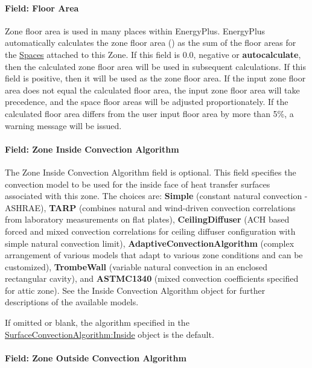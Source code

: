 \paragraph{Field: Floor Area}\label{field-floor-area}

Zone floor area is used in many places within EnergyPlus. EnergyPlus automatically calculates the zone floor area (\SI{}{\area}) as the sum of the floor areas for the \hyperref[space]{Spaces} attached to this Zone. If this field is 0.0, negative or \textbf{autocalculate}, then the calculated zone floor area will be used in subsequent calculations. If this field is positive, then it will be used as the zone floor area. If the input zone floor area does not equal the calculated floor area, the input zone floor area will take precedence, and the space floor areas will be adjusted proportionately. If the calculated floor area differs from the user input floor area by more than 5\%, a warning message will be issued.

\paragraph{Field: Zone Inside Convection Algorithm}\label{field-zone-inside-convection-algorithm}

The Zone Inside Convection Algorithm field is optional. This field specifies the convection model to be used for the inside face of heat transfer surfaces associated with this zone. The choices are: \textbf{Simple} (constant natural convection - ASHRAE), \textbf{TARP} (combines natural and wind-driven convection correlations from laboratory measurements on flat plates), \textbf{CeilingDiffuser} (ACH based forced and mixed convection correlations for ceiling diffuser configuration with simple natural convection limit), \textbf{AdaptiveConvectionAlgorithm} (complex arrangement of various models that adapt to various zone conditions and can be customized), \textbf{TrombeWall} (variable natural convection in an enclosed rectangular cavity), and \textbf{ASTMC1340} (mixed convection coefficients specified for attic zone). See the Inside Convection Algorithm object for further descriptions of the available models.

If omitted or blank, the algorithm specified in the \hyperref[surfaceconvectionalgorithminside]{SurfaceConvectionAlgorithm:Inside} object is the default.

\paragraph{Field: Zone Outside Convection Algorithm}\label{field-zone-outside-convection-algorithm}

